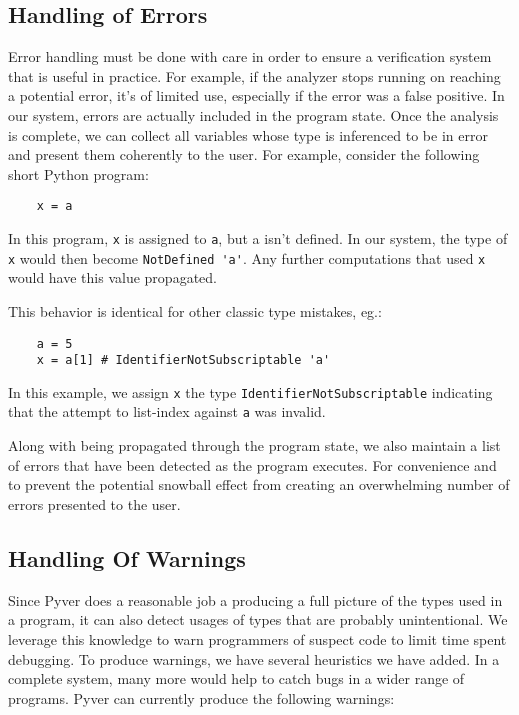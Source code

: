 \documentclass{article}[12pt]
\begin{document}
\subsection{Handling of Errors}

Error handling must be done with care in order to ensure a verification system that is useful in practice. For example,
if the analyzer stops running on reaching a potential error, it's of limited use, especially if the error was a false
positive. In our system, errors are actually included in the program state. Once the analysis is complete, we can
collect all variables whose type is inferenced to be in error and present them coherently to the user. For example,
consider the following short Python program:

\begin{verbatim}
    x = a
\end{verbatim}
In this program, \verb=x= is assigned to \verb=a=, but a isn't defined. In our system, the type of
\verb=x= would then become \verb=NotDefined 'a'=. Any further computations that used \verb=x= would
have this value propagated.

This behavior is identical for other classic type mistakes, eg.:
\begin{verbatim}
    a = 5
    x = a[1] # IdentifierNotSubscriptable 'a'
\end{verbatim}
In this example, we assign \verb=x= the type \texttt{IdentifierNotSubscriptable} indicating that the attempt to
list-index against \texttt{a} was invalid.

Along with being propagated through the program state, we also maintain a list of errors that have been detected as the
program executes. For convenience and to prevent the potential snowball effect from creating an overwhelming number of
errors presented to the user.

\subsection{Handling Of Warnings}
Since Pyver does a reasonable job a producing a full picture of the types used in a program, it
can also detect usages of types that are probably unintentional. We leverage this knowledge to warn
programmers of suspect code to limit time spent debugging. To produce warnings, we have several heuristics we have added. In a complete system, many more would
help to catch bugs in a wider range of programs. Pyver can currently produce the following warnings:
\end{document}
